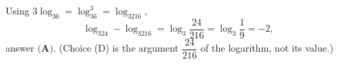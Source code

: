 Using $3\log_36=\log_36^3=\log_3216$,
\[
\log_324-\log_3216=\log_3\dfrac{24}{216}=\log_3\dfrac{1}{9}=-2 ,
\]
answer $\boxed{\textbf{(A)}}$. (Choice (D) is the argument $\dfrac{24}{216}$ of the logarithm, not its value.)

